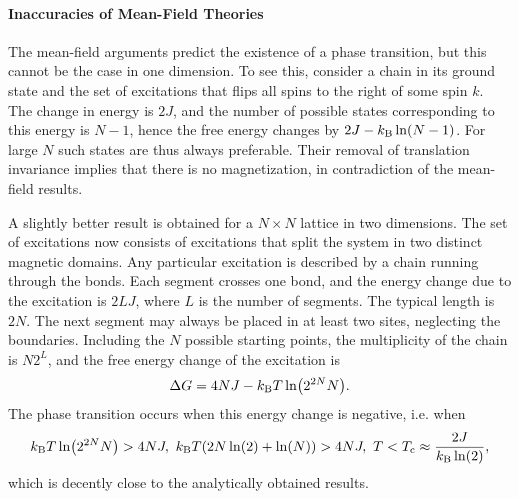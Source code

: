 \paragraph{Inaccuracies of Mean-Field Theories}
The mean-field arguments predict the existence of a phase transition, but this cannot be the case in one dimension. To see this, consider a chain in its ground state and the set of excitations that flips all spins to the right of some spin $k$. The change in energy is $2J$, and the number of possible states corresponding to this energy is $N - 1$, hence the free energy changes by $2J - k_{\text{B}}\ln(N - 1)$. For large $N$ such states are thus always preferable. Their removal of translation invariance implies that there is no magnetization, in contradiction of the mean-field results.

A slightly better result is obtained for a $N\times N$ lattice in two dimensions. The set of excitations now consists of excitations that split the system in two distinct magnetic domains. Any particular excitation is described by a chain running through the bonds. Each segment crosses one bond, and the energy change due to the excitation is $2LJ$, where $L$ is the number of segments. The typical length is $2N$. The next segment may always be placed in at least two sites, neglecting the boundaries. Including the $N$ possible starting points, the multiplicity of the chain is $N2^{L}$, and the free energy change of the excitation is
\begin{align*}
	\Delta G = 4NJ - k_{\text{B}} T\ln(2^{2N}N).
\end{align*}
The phase transition occurs when this energy change is negative, i.e. when
\begin{align*}
	k_{\text{B}} T\ln(2^{2N}N) > 4NJ,\ k_{\text{B}} T(2N\ln(2) + \ln(N)) > 4NJ,\ T < T_{\text{c}} \approx \frac{2J}{k_{\text{B}}\ln(2)},
\end{align*}
which is decently close to the analytically obtained results.